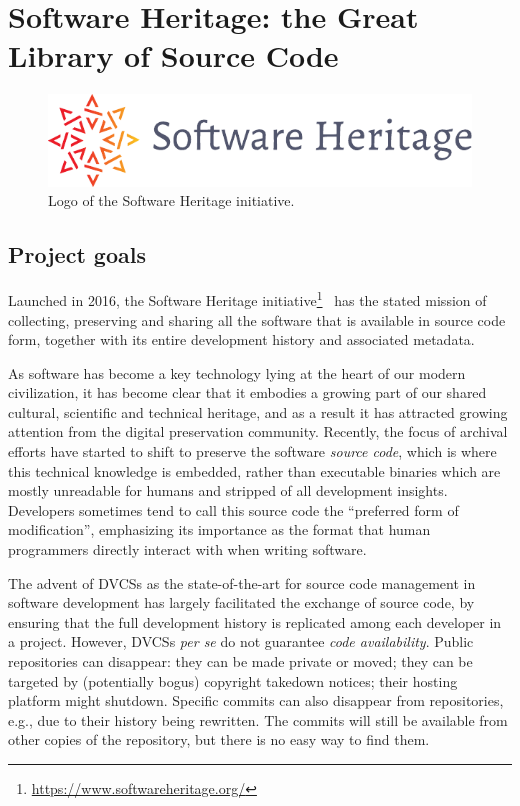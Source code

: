 \chapter{Software Heritage: the Great Library of Source Code}%
\label{chp:software-heritage}

\begin{figure}
    \centering
    \includegraphics[width=0.5\linewidth]{img/SWH-logo}
    \caption{Logo of the Software Heritage initiative.}
\end{figure}

\section{Project goals}

Launched in 2016, the Software Heritage
initiative\footnote{\url{https://www.softwareheritage.org/}}~\cite{swhcacm2018}
has the stated mission of collecting, preserving and sharing all the software
that is available in source code form, together with its entire development
history and associated metadata.

As software has become a key technology lying at the heart of our modern
civilization, it has become clear that it embodies a growing part of our shared
cultural, scientific and technical heritage, and as a result it has attracted
growing attention from the digital preservation community.
Recently, the focus of archival efforts have started to shift to preserve the
software \emph{source code}, which is where this technical knowledge is
embedded, rather than executable binaries which are mostly unreadable for
humans and stripped of all development insights. Developers sometimes tend to
call this source code the ``preferred form of modification'', emphasizing its
importance as the format that human programmers directly interact with when
writing software.

The advent of \glspl{DVCS} as the state-of-the-art for source code management
in software development has largely facilitated the exchange of source code,
by ensuring that the full development history is replicated among each
developer in a project. However, \glspl{DVCS} \emph{per se} do not guarantee
\emph{code availability}. Public repositories can disappear: they can be made
private or moved; they can be targeted by (potentially bogus) copyright
takedown notices; their hosting platform might shutdown. Specific commits can
also disappear from repositories, e.g., due to their history being rewritten.
The commits will still be available from other copies of the repository, but
there is no easy way to find them.

